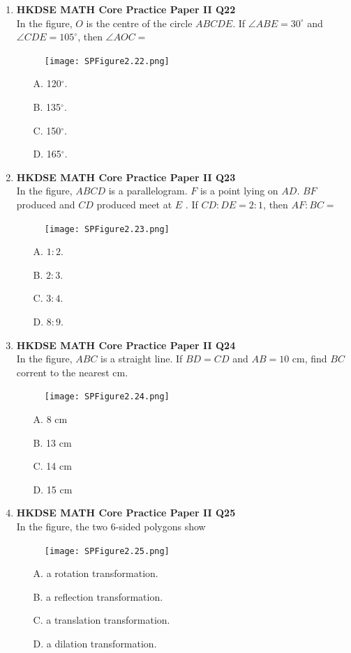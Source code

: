 \documentclass[12pt]{article}
\begin{document}
\begin{enumerate}
	\item \textbf{HKDSE MATH Core Practice Paper II Q22}\\
	In the figure, $O$ is the centre of the circle $ABCDE$. If $\angle ABE = 30^\circ$ and $\angle CDE = 105^\circ$, then $\angle AOC = $
	\begin{figure}[H]
		\centering
		\texttt{[image: SPFigure2.22.png]}	
	\end{figure}
	\begin{enumerate}
		\item[A.] 120$^\circ$.
		\item[B.] 135$^\circ$.
		\item[C.] 150$^\circ$.
		\item[D.] 165$^\circ$.
	\end{enumerate}
	
	\item \textbf{HKDSE MATH Core Practice Paper II Q23}\\
	In the figure, $ABCD$ is a parallelogram. $F$ is a point lying on $AD$. $BF$ produced and $CD$ produced meet at $E$ . If $CD : DE = 2 : 1$, then $AF : BC =$
	\begin{figure}[H]
		\centering
		\texttt{[image: SPFigure2.23.png]}	
	\end{figure}
	\begin{enumerate}
		\item[A.] $1 : 2$.
		\item[B.] $2 : 3$.
		\item[C.] $3 : 4$.
		\item[D.] $8 : 9$.
	\end{enumerate}

	\item \textbf{HKDSE MATH Core Practice Paper II Q24}\\
	In the figure, $ABC$ is a straight line. If $BD = CD$ and $AB = 10$ cm, find $BC$ corrent to the nearest cm.
	\begin{figure}[H]
		\centering
		\texttt{[image: SPFigure2.24.png]}	
	\end{figure}
	\begin{enumerate}
		\item[A.] 8 cm
		\item[B.] 13 cm
		\item[C.] 14 cm
		\item[D.] 15 cm
	\end{enumerate}

	\item \textbf{HKDSE MATH Core Practice Paper II Q25}\\
	In the figure, the two 6-sided polygons show
	\begin{figure}[H]
		\centering
		\texttt{[image: SPFigure2.25.png]}	
	\end{figure}
	\begin{enumerate}
		\item[A.] a rotation transformation.
		\item[B.] a reflection transformation.
		\item[C.] a translation transformation.
		\item[D.] a dilation transformation.
	\end{enumerate}
	

\end{enumerate}
\end{document}
